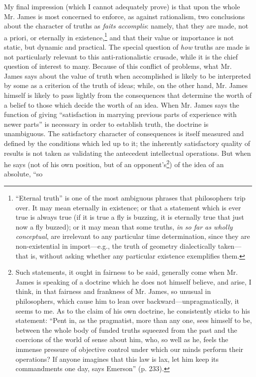 \documentclass[12pt]{article}
\begin{document}
My final impression (which I cannot adequately prove) is that upon the
whole Mr. James is most concerned to enforce, as against rationalism,
two conclusions about the character of truths as \emph{faits accomplis}:
namely, that they are made, not a priori, or eternally in
existence,\footnote{``Eternal truth'' is one of the most ambiguous phrases that
philosophers trip over. It may mean eternally in existence; or that a
statement which is ever true is always true (if it is true a fly is
buzzing, it is eternally true that just now a fly buzzed); or it may
mean that some truths, \emph{in so far as wholly conceptual}, are
irrelevant to any particular time determination, since they are
non-existential in import—e.g., the truth of geometry dialectically
taken—that is, without asking whether any particular existence
exemplifies them.} and that their value or
importance is not static, but dynamic and practical. The special
question of \emph{how} truths are made is not particularly relevant to this
anti-rationalistic crusade, while it is the chief question of interest
to many. Because of this conflict of problems, what Mr. James says
about the value of truth when accomplished is likely to be interpreted
by some as a criterion of the truth of ideas; while, on the other
hand, Mr. James himself is likely to pass lightly from the
consequences that determine the worth of a belief to those which
decide the worth of an idea. When Mr. James says the function of
giving ``satisfaction in marrying previous parts of experience with
newer parts'' is necessary in order to establish truth, the doctrine is
unambiguous. The satisfactory character of consequences is itself
measured and defined by the conditions which led up to it; the
inherently satisfactory quality of results is not taken as validating
the antecedent intellectual operations. But when he says (not of his
own position, but of an opponent's\footnote{Such statements, it ought in fairness to be said,
generally come when Mr. James is speaking of a doctrine which he does
not himself believe, and arise, I think, in that fairness and
frankness of Mr. James, so unusual in philosophers, which cause him to
lean over backward—unpragmatically, it seems to me. As to the claim
of his own doctrine, he consistently sticks to his statement: ``Pent
in, as the pragmatist, more than any one, sees himself to be, between
the whole body of funded truths squeezed from the past and the
coercions of the world of sense about him, who, so well as he, feels
the immense pressure of objective control under which our minds
perform their operations? If anyone imagines that this law is lax, let
him keep its commandments one day, says Emerson'' (p. 233).}) of the idea of an absolute, ``so
\end{document}
